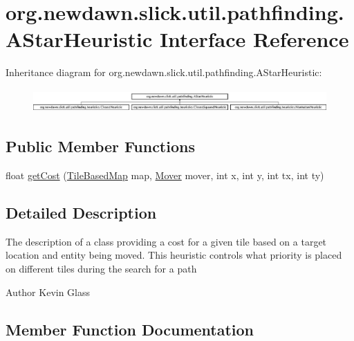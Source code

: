 \hypertarget{interfaceorg_1_1newdawn_1_1slick_1_1util_1_1pathfinding_1_1_a_star_heuristic}{}\section{org.\+newdawn.\+slick.\+util.\+pathfinding.\+A\+Star\+Heuristic Interface Reference}
\label{interfaceorg_1_1newdawn_1_1slick_1_1util_1_1pathfinding_1_1_a_star_heuristic}
Inheritance diagram for org.\+newdawn.\+slick.\+util.\+pathfinding.\+A\+Star\+Heuristic\+:\begin{figure}[H]
\begin{center}
\leavevmode
\includegraphics[height=0.908354cm]{interfaceorg_1_1newdawn_1_1slick_1_1util_1_1pathfinding_1_1_a_star_heuristic}
\end{center}
\end{figure}
\subsection*{Public Member Functions}
\begin{DoxyCompactItemize}
\item 
float \mbox{\hyperlink{interfaceorg_1_1newdawn_1_1slick_1_1util_1_1pathfinding_1_1_a_star_heuristic_a6655bf4053ece54e62beec26876ad285}{get\+Cost}} (\mbox{\hyperlink{interfaceorg_1_1newdawn_1_1slick_1_1util_1_1pathfinding_1_1_tile_based_map}{Tile\+Based\+Map}} map, \mbox{\hyperlink{interfaceorg_1_1newdawn_1_1slick_1_1util_1_1pathfinding_1_1_mover}{Mover}} mover, int x, int y, int tx, int ty)
\end{DoxyCompactItemize}


\subsection{Detailed Description}
The description of a class providing a cost for a given tile based on a target location and entity being moved. This heuristic controls what priority is placed on different tiles during the search for a path

\begin{DoxyAuthor}{Author}
Kevin Glass 
\end{DoxyAuthor}


\subsection{Member Function Documentation}
\mbox{\label{interfaceorg_1_1newdawn_1_1slick_1_1util_1_1pathfinding_1_1_a_star_heuristic_a6655bf4053ece54e62beec26876ad285}} 
